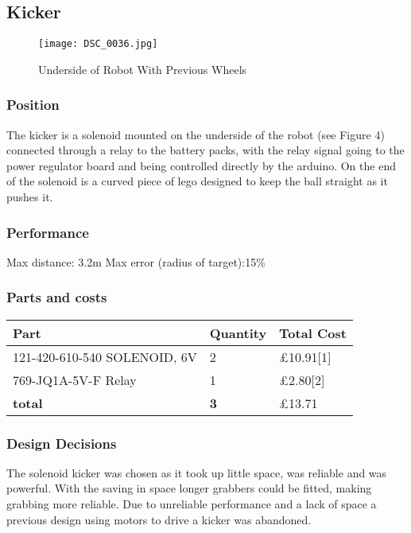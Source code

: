 \documentclass[a4paper]{article}
\begin{document}
\subsection{Kicker}
\begin{figure}[!ht]
\caption{Underside of Robot With Previous Wheels}
\centering
\texttt{[image: DSC\_0036.jpg]}
\end{figure}
\subsubsection{Position}
The kicker is a solenoid mounted on the underside of the robot (see Figure 4) connected through a relay to the battery packs, with the relay signal going to the power regulator board and being controlled directly by the arduino. On the end of the solenoid is a curved piece of lego designed to keep the ball straight as it pushes it.

\subsubsection{Performance}
Max distance: 3.2m 
Max error (radius of target):15\%

\subsubsection{Parts and costs}
\begin{center}
\begin{tabular}{ | m{3cm} | m{3cm}| m{6cm} | }
\hline
\textbf{Part} & \textbf{Quantity} & \textbf{Total Cost} \\
\hline
121-420-610-540  SOLENOID, 6V & 2 &  £10.91[1] \\
\hline
769-JQ1A-5V-F Relay & 1 &  £2.80[2] \\
\hline
\textbf{total} & \textbf{3} & £13.71 \\
\hline
\end{tabular}
\end{center}

\subsubsection{Design Decisions}
The solenoid kicker was chosen as it took up little space, was reliable and was powerful. With the saving in space longer grabbers could be fitted, making grabbing more reliable. Due to unreliable performance and a lack of space a previous design using motors to drive a kicker was abandoned.
\end{document}
